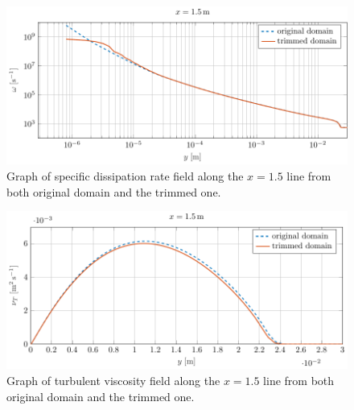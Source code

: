 \begin{figure}
\centering
\includegraphics[width=14cm]{Results/omega15.pdf}
\caption{Graph of specific dissipation rate field along the $x=1.5$ line from both original domain and the trimmed one.}
\label{fig::omega15}
\end{figure}

\begin{figure}
\centering
\includegraphics[width=14cm]{Results/nut15.pdf}
\caption{Graph of turbulent viscosity field along the $x=1.5$ line from both original domain and the trimmed one.}
\label{fig::nut15}
\end{figure}